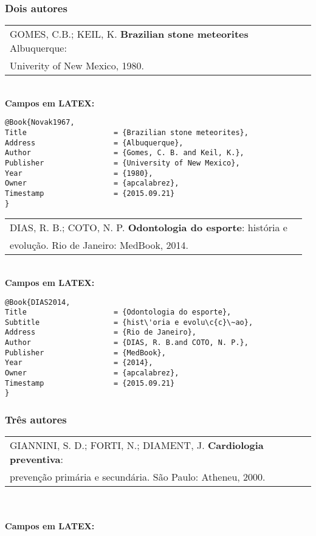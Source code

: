 \subsubsection{Dois autores}

\begin{tabular}{|l|c|} \hline
GOMES, C.B.; KEIL, K. \textbf{Brazilian stone meteorites} Albuquerque: \\ Univerity of New Mexico, 1980. \\\hline
\end{tabular}\\

\textbf{Campos em LATEX:}
\begin{verbatim}
@Book{Novak1967,
Title                    = {Brazilian stone meteorites},
Address                  = {Albuquerque},
Author                   = {Gomes, C. B. and Keil, K.},
Publisher                = {University of New Mexico},
Year                     = {1980},
Owner                    = {apcalabrez},
Timestamp                = {2015.09.21}
}
\end{verbatim}

\begin{tabular}{|l|c|} \hline
DIAS, R. B.; COTO, N. P. \textbf{Odontologia do esporte}: hist\'oria e \\ evolu\c{c}\~ao. Rio de Janeiro: MedBook, 2014. \\\hline
\end{tabular}\\

\textbf{Campos em LATEX:}

\begin{verbatim}
@Book{DIAS2014,
Title                    = {Odontologia do esporte},
Subtitle                 = {hist\'oria e evolu\c{c}\~ao},
Address                  = {Rio de Janeiro},
Author                   = {DIAS, R. B.and COTO, N. P.},
Publisher                = {MedBook},
Year                     = {2014},
Owner                    = {apcalabrez},
Timestamp                = {2015.09.21}
}
\end{verbatim}

\subsubsection{Tr\^es autores}

\begin{tabular}{|l|c|} \hline
GIANNINI, S. D.; FORTI, N.; DIAMENT, J. \textbf{Cardiologia preventiva}:\\ preven\c{c}\~ao prim\'aria e secund\'aria. S\~ao Paulo: Atheneu, 2000. \\\hline
\end{tabular}\\
\\
\textbf{Campos em LATEX:}


